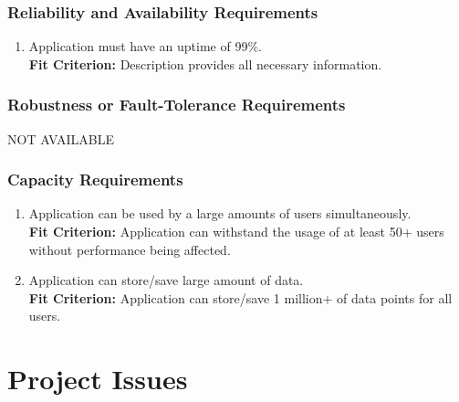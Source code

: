 \documentclass[12pt,letterpaper]{article}
\begin{document}
\subsubsection{Reliability and Availability Requirements}
\begin{enumerate}[resume*] 
	\item Application must have an uptime of 99\%.\\
	{\textbf{Fit Criterion:} Description provides all necessary information. }
\end{enumerate}

\subsubsection{Robustness or Fault-Tolerance Requirements}
\noindent NOT AVAILABLE

\subsubsection{Capacity Requirements}
\begin{enumerate}[resume*] 
	\item Application can be used by a large amounts of users simultaneously.\\
	{\textbf{Fit Criterion:} Application can withstand the usage of at least 50+ users without performance being affected. }
	\item Application can store/save large amount of data.\\
	{\textbf{Fit Criterion:} Application can store/save 1 million+ of data points for all users. }
\end{enumerate}

\section{Project Issues}
\end{document}
